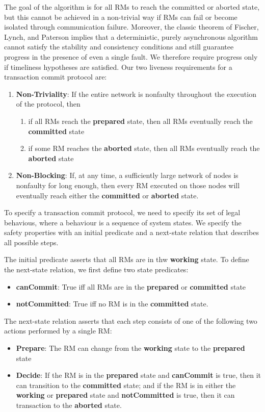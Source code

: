 \documentclass[11pt]{article}
\begin{document}
The goal of the algorithm is for all RMs to reach the committed or aborted state, but this cannot be
achieved in a non-trivial way if RMs can fail or become isolated through communication failure.
Moreover, the classic theorem of Fischer, Lynch, and Paterson implies that a deterministic, purely
asynchronous algorithm cannot satisfy the stability and consistency conditions and still guarantee
progress in the presence of even a single fault. We therefore require progress only if timeliness
hypotheses are satisfied. Our two liveness requirements for a transaction commit protocol are:
\begin{enumerate}
\item \textbf{Non-Triviality}: If the entire network is nonfaulty throughout the execution of the protocol, then
\begin{enumerate}
\item if all RMs reach the \textbf{prepared} state, then all RMs eventually reach the \textbf{committed} state
\item if some RM reaches the \textbf{aborted} state, then all RMs eventually reach the \textbf{aborted} state
\end{enumerate}
\item \textbf{Non-Blocking}: If, at any time, a sufficiently large network of nodes is nonfaulty for long enough,
then every RM executed on those nodes will eventually reach either the \textbf{committed} or \textbf{aborted} state.
\end{enumerate}


To specify a transaction commit protocol, we need to specify its set of legal behavious, where a
behaviour is a sequence of system states. We specify the safety properties with an initial predicate
and a next-state relation that describes all possible steps.

The initial predicate asserts that all RMs are in thw \textbf{working} state. To define the next-state
relation, we first define two state predicates:
\begin{itemize}
\item \textbf{canCommit}: True iff all RMs are in the \textbf{prepared} or \textbf{committed} state
\item \textbf{notCommitted}: True iff no RM is in the \textbf{committed} state.
\end{itemize}

The next-state relation asserts that each step consists of one of the following two actions performed
by a single RM:
\begin{itemize}
\item \textbf{Prepare}: The RM can change from the \textbf{working} state to the \textbf{prepared} state
\item \textbf{Decide}: If the RM is in the \textbf{prepared} state and \textbf{canCommit} is true, then it can transition to the
\textbf{committed} state; and if the RM is in either the \textbf{working} or \textbf{prepared} state and \textbf{notCommitted} is true,
then it can transaction to the \textbf{aborted} state.
\end{itemize}
\end{document}
